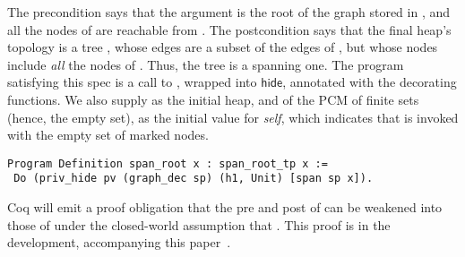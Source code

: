 The precondition says that the argument  is the root of the
graph  stored in , and all the nodes of 
are reachable from . 
%
The postcondition says that the final heap's topology is a tree
, whose edges are a subset of the edges of , but
whose nodes include \emph{all} the nodes of . Thus, the tree
is a spanning one.
%
The program satisfying this spec is a call to , wrapped
into $\mathsf{hide}$, annotated with the decorating functions. We also
supply  as the initial heap, and  of the PCM of
finite sets (hence, the empty set), as the initial value for
\emph{self}, which indicates that  is invoked with the
empty set of marked nodes.
% 
\begin{lstlisting}
Program Definition span_root x : span_root_tp x := 
 Do (priv_hide pv (graph_dec sp) (h1, Unit) [span sp x]).  
\end{lstlisting}
%
Coq will emit a proof obligation that the pre and post of
 can be weakened into those of  under
the closed-world assumption that . This proof is
in the development, accompanying this paper~\cite{Sergey-al:PLDI15TR}.
